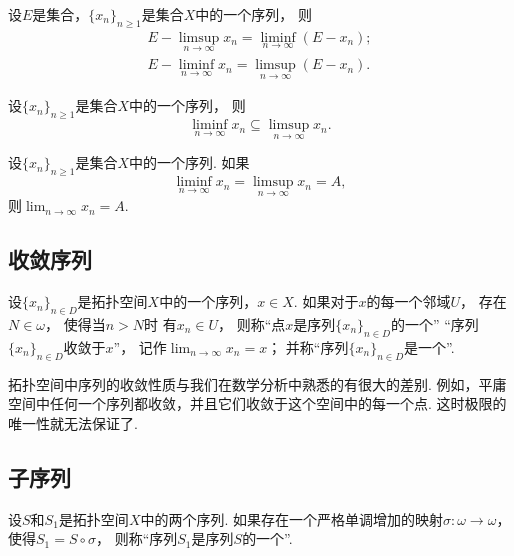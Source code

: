 \begin{proposition}
设\(E\)是集合，\(\{x_n\}_{n\geq1}\)是集合\(X\)中的一个序列，
则\begin{gather}
	E - \limsup_{n\to\infty} x_n = \liminf_{n\to\infty} (E - x_n); \\
	E - \liminf_{n\to\infty} x_n = \limsup_{n\to\infty} (E - x_n).
\end{gather}
\end{proposition}

\begin{proposition}
设\(\{x_n\}_{n\geq1}\)是集合\(X\)中的一个序列，
则\begin{equation}
	\liminf_{n\to\infty} x_n
	\subseteq
	\limsup_{n\to\infty} x_n.
\end{equation}
\end{proposition}

\begin{theorem}
设\(\{x_n\}_{n\geq1}\)是集合\(X\)中的一个序列.
如果\begin{equation*}
	\liminf_{n\to\infty} x_n
	= \limsup_{n\to\infty} x_n
	= A,
\end{equation*}
则\(\lim_{n\to\infty} x_n = A\).
\end{theorem}

\subsection{收敛序列}
\begin{definition}\label{definition:序列.序列的聚点}
设\(\{x_n\}_{n \in D}\)是拓扑空间\(X\)中的一个序列，\(x \in X\).
如果对于\(x\)的每一个邻域\(U\)，
存在\(N \in \omega\)，
使得当\(n > N\)时
有\(x_n \in U\)，
则称“点\(x\)是序列\(\{x_n\}_{n \in D}\)的一个”
“序列\(\{x_n\}_{n \in D}\)收敛于\(x\)”，
记作\(\lim_{n\to\infty} x_n = x\)；
并称“序列\(\{x_n\}_{n \in D}\)是一个”.
\end{definition}

拓扑空间中序列的收敛性质与我们在数学分析中熟悉的有很大的差别.
例如，平庸空间中任何一个序列都收敛，并且它们收敛于这个空间中的每一个点.
这时极限的唯一性就无法保证了.

\subsection{子序列}
\begin{definition}\label{definition:序列.子序列}
设\(S\)和\(S_1\)是拓扑空间\(X\)中的两个序列.
如果存在一个严格单调增加的映射\(\sigma\colon \omega \to \omega\)，
使得\(S_1 = S \circ \sigma\)，
则称“序列\(S_1\)是序列\(S\)的一个”.
\end{definition}


